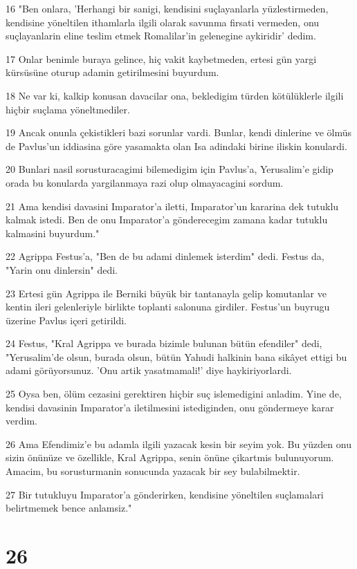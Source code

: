 \par 16 "Ben onlara, 'Herhangi bir sanigi, kendisini suçlayanlarla yüzlestirmeden, kendisine yöneltilen ithamlarla ilgili olarak savunma firsati vermeden, onu suçlayanlarin eline teslim etmek Romalilar'in gelenegine aykiridir' dedim.
\par 17 Onlar benimle buraya gelince, hiç vakit kaybetmeden, ertesi gün yargi kürsüsüne oturup adamin getirilmesini buyurdum.
\par 18 Ne var ki, kalkip konusan davacilar ona, bekledigim türden kötülüklerle ilgili hiçbir suçlama yöneltmediler.
\par 19 Ancak onunla çekistikleri bazi sorunlar vardi. Bunlar, kendi dinlerine ve ölmüs de Pavlus'un iddiasina göre yasamakta olan Isa adindaki birine iliskin konulardi.
\par 20 Bunlari nasil sorusturacagimi bilemedigim için Pavlus'a, Yerusalim'e gidip orada bu konularda yargilanmaya razi olup olmayacagini sordum.
\par 21 Ama kendisi davasini Imparator'a iletti, Imparator'un kararina dek tutuklu kalmak istedi. Ben de onu Imparator'a gönderecegim zamana kadar tutuklu kalmasini buyurdum."
\par 22 Agrippa Festus'a, "Ben de bu adami dinlemek isterdim" dedi. Festus da, "Yarin onu dinlersin" dedi.
\par 23 Ertesi gün Agrippa ile Berniki büyük bir tantanayla gelip komutanlar ve kentin ileri gelenleriyle birlikte toplanti salonuna girdiler. Festus'un buyrugu üzerine Pavlus içeri getirildi.
\par 24 Festus, "Kral Agrippa ve burada bizimle bulunan bütün efendiler" dedi, "Yerusalim'de olsun, burada olsun, bütün Yahudi halkinin bana sikâyet ettigi bu adami görüyorsunuz. 'Onu artik yasatmamali!' diye haykiriyorlardi.
\par 25 Oysa ben, ölüm cezasini gerektiren hiçbir suç islemedigini anladim. Yine de, kendisi davasinin Imparator'a iletilmesini istediginden, onu göndermeye karar verdim.
\par 26 Ama Efendimiz'e bu adamla ilgili yazacak kesin bir seyim yok. Bu yüzden onu sizin önünüze ve özellikle, Kral Agrippa, senin önüne çikartmis bulunuyorum. Amacim, bu sorusturmanin sonucunda yazacak bir sey bulabilmektir.
\par 27 Bir tutukluyu Imparator'a gönderirken, kendisine yöneltilen suçlamalari belirtmemek bence anlamsiz."

\chapter{26}

